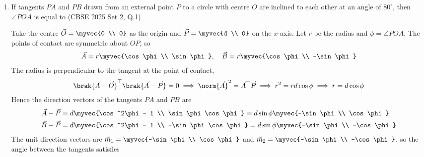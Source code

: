 \begin{enumerate}[label=\thesubsection.\arabic*, ref=\thesubsection.\theenumi]
\item
If tangents $PA$ and $PB$ drawn from an external point $P$ to a circle with centre $O$ are inclined to each other at an angle of $80^\circ$, then $\angle POA$ is equal to
\hfill (CBSE 2025 Set 2, Q.1)
\begin{enumerate}
	\begin{multicols}{4}
    \item $40^\circ$
    \item $50^\circ$
    \item $60^\circ$
    \item $80^\circ$
	\end{multicols}
\end{enumerate}
\solution
Take the centre $\vec{O} = \myvec{0 \\ 0}$ as the origin and $\vec{P} = \myvec{d \\ 0}$ on the $x$-axis. Let $r$ be the radius and $\phi = \angle POA$. The points of contact are symmetric about $OP$, so
\begin{align}
	\vec{A} = r\myvec{\cos\phi \\ \sin\phi}, \quad \vec{B} = r\myvec{\cos\phi \\ -\sin\phi}
\end{align}
The radius is perpendicular to the tangent at the point of contact,
\begin{align}
	\brak{\vec{A}-\vec{O}}^{\top}\brak{\vec{A}-\vec{P}} = 0 \implies \norm{\vec{A}}^2 = \vec{A}^{\top}\vec{P}
	\implies r^2 = rd\cos\phi \implies r = d\cos\phi
\end{align}
Hence the direction vectors of the tangents $PA$ and $PB$ are
\begin{align}
	\vec{A}-\vec{P} &= d\myvec{\cos^2\phi - 1 \\ \sin\phi\cos\phi} = d\sin\phi\myvec{-\sin\phi \\ \cos\phi}
	\\
	\vec{B}-\vec{P} &= d\myvec{\cos^2\phi - 1 \\ -\sin\phi\cos\phi} = d\sin\phi\myvec{-\sin\phi \\ -\cos\phi}
\end{align}
The unit direction vectors are $\vec{m}_1 = \myvec{-\sin\phi \\ \cos\phi}$ and $\vec{m}_2 = \myvec{-\sin\phi \\ -\cos\phi}$, so the angle between the tangents satisfies
\begin{align}

\end{align}
\end{enumerate}
